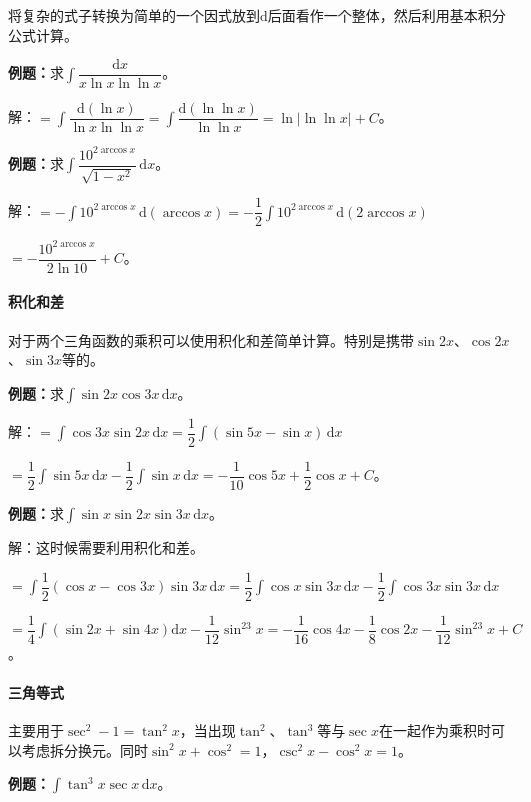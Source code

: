 \documentclass[UTF8, 12pt]{ctexart}
\begin{document}
将复杂的式子转换为简单的一个因式放到$\textrm{d}$后面看作一个整体，然后利用基本积分公式计算。

\textbf{例题：}求$\displaystyle{\int\dfrac{\textrm{d}x}{x\ln x\ln\ln x}}$。 \medskip

解：$=\displaystyle{\int\dfrac{\textrm{d}(\ln x)}{\ln x\ln\ln x}}=\displaystyle{\int\dfrac{\textrm{d}(\ln\ln x)}{\ln\ln x}}=\ln\vert\ln\ln x\vert+C$。\medskip

\textbf{例题：}求$\displaystyle{\int\dfrac{10^{2\arccos x}}{\sqrt{1-x^2}}\,\textrm{d}x}$。

解：$=-\displaystyle{\int10^{2\arccos x}\,\textrm{d}(\arccos x)}=-\dfrac{1}{2}\displaystyle{\int10^{2\arccos x}\,\textrm{d}(2\arccos x)}$

$=-\dfrac{10^{2\arccos x}}{2\ln10}+C$。

\paragraph{积化和差} \leavevmode \medskip

对于两个三角函数的乘积可以使用积化和差简单计算。特别是携带$\sin2x$、$\cos2x$、$\sin3x$等的。

\textbf{例题：}求$\displaystyle{\int\sin2x\cos3x\,\textrm{d}x}$。

解：$=\displaystyle{\int\cos3x\sin2x\,\textrm{d}x=\dfrac{1}{2}\int(\sin5x-\sin x)\,\textrm{d}x}$

$=\dfrac{1}{2}\int\sin5x\,\textrm{d}x-\dfrac{1}{2}\int\sin x\,\textrm{d}x=-\dfrac{1}{10}\cos5x+\dfrac{1}{2}\cos x+C$。

\textbf{例题：}求$\int\sin x\sin2x\sin3x\,\textrm{d}x$。

解：这时候需要利用积化和差。

$=\displaystyle{\int\dfrac{1}{2}(\cos x-\cos3x)\sin3x\,\textrm{d}x=\dfrac{1}{2}\int\cos x\sin3x\,\textrm{d}x-\dfrac{1}{2}\int\cos3x\sin3x\,\textrm{d}x}$

$=\dfrac{1}{4}\int(\sin2x+\sin4x)\textrm{d}x-\dfrac{1}{12}\sin^23x=-\dfrac{1}{16}\cos4x-\dfrac{1}{8}\cos2x-\dfrac{1}{12}\sin^23x+C$。

\paragraph{三角等式} \leavevmode \medskip

主要用于$\sec^2-1=\tan^2x$，当出现$\tan^2$、$\tan^3$等与$\sec x$在一起作为乘积时可以考虑拆分换元。同时$\sin^2x+\cos^2=1$，$\csc^2x-\cos^2x=1$。

\textbf{例题：}$\displaystyle{\int\tan^3x\sec x\,\textrm{d}x}$。
\end{document}

